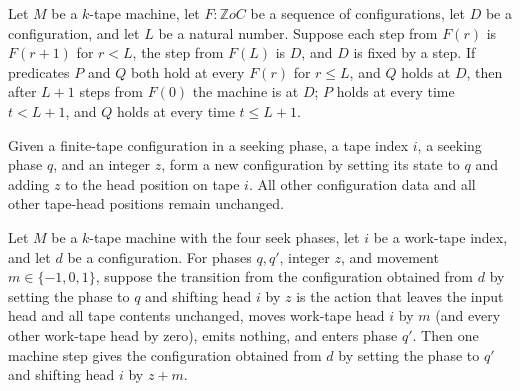 \begin{theorem}
\label{Turing.catalog_pass_contract}
\leanok
{}
Let $M$ be a $k$-tape machine, let $F:\mathbb{Z}	o C$ be a sequence of configurations, let $D$
be a configuration, and let $L$ be a natural number. Suppose each step from $F(r)$ is
$F(r+1)$ for $r<L$, the step from $F(L)$ is $D$, and $D$ is fixed by a step. If
predicates $P$ and $Q$ both hold at every $F(r)$ for $r\le L$, and $Q$ holds at $D$,
then after $L+1$ steps from $F(0)$ the machine is at $D$; $P$ holds at every time
$t<L+1$, and $Q$ holds at every time $t\le L+1$.
\end{theorem}

\begin{definition}
\label{Turing.catalogSeekCfg}
\leanok
{}
Given a finite-tape configuration in a seeking phase, a tape index $i$, a seeking phase
$q$, and an integer $z$, form a new configuration by setting its state to $q$ and adding
$z$ to the head position on tape $i$. All other configuration data and all other
tape-head positions remain unchanged.
\end{definition}

\begin{theorem}
\label{Turing.catalog_seek_step}
\leanok
{}
Let $M$ be a $k$-tape machine with the four seek phases, let $i$ be a work-tape index,
and let $d$ be a configuration. For phases $q,q'$, integer $z$, and movement
$m\in\{-1,0,1\}$, suppose the transition from the configuration obtained from $d$ by
setting the phase to $q$ and shifting head $i$ by $z$ is the action that leaves the
input head and all tape contents unchanged, moves work-tape head $i$ by $m$ (and every
other work-tape head by zero), emits nothing, and enters phase $q'$. Then one machine
step gives the configuration obtained from $d$ by setting the phase to $q'$ and shifting
head $i$ by $z+m$.
\end{theorem}

